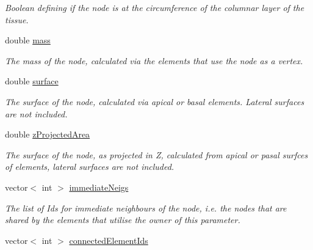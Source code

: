 \begin{DoxyCompactItemize}
\begin{DoxyCompactList}\small\item\em Boolean defining if the node is at the circumference of the columnar layer of the tissue. \end{DoxyCompactList}\item 
\hypertarget{classNode_a63e510fc9158eb15e751861bc14eae38}{}double \hyperlink{classNode_a63e510fc9158eb15e751861bc14eae38}{mass}\label{classNode_a63e510fc9158eb15e751861bc14eae38}

\begin{DoxyCompactList}\small\item\em The mass of the node, calculated via the elements that use the node as a vertex. \end{DoxyCompactList}\item 
\hypertarget{classNode_aab30ea418838635c21593c47f39f2699}{}double \hyperlink{classNode_aab30ea418838635c21593c47f39f2699}{surface}\label{classNode_aab30ea418838635c21593c47f39f2699}

\begin{DoxyCompactList}\small\item\em The surface of the node, calculated via apical or basal elements. Lateral surfaces are not included. \end{DoxyCompactList}\item 
\hypertarget{classNode_af8e9678dfeffc9e99d925a83b58fde3d}{}double \hyperlink{classNode_af8e9678dfeffc9e99d925a83b58fde3d}{z\+Projected\+Area}\label{classNode_af8e9678dfeffc9e99d925a83b58fde3d}

\begin{DoxyCompactList}\small\item\em The surface of the node, as projected in Z, calculated from apical or pasal surfces of elements, lateral surfaces are not included. \end{DoxyCompactList}\item 
\hypertarget{classNode_ab22060fb9f61a0d93ec52e6045828782}{}vector$<$ int $>$ \hyperlink{classNode_ab22060fb9f61a0d93ec52e6045828782}{immediate\+Neigs}\label{classNode_ab22060fb9f61a0d93ec52e6045828782}

\begin{DoxyCompactList}\small\item\em The list of Id\textquotesingle{}s for immediate neighbours of the node, i.\+e. the nodes that are shared by the elements that utilise the owner of this parameter. \end{DoxyCompactList}\item 
\hypertarget{classNode_a18bae606efb025cc90b4c117776e0bf9}{}vector$<$ int $>$ \hyperlink{classNode_a18bae606efb025cc90b4c117776e0bf9}{connected\+Element\+Ids}\label{classNode_a18bae606efb025cc90b4c117776e0bf9}


\end{DoxyCompactItemize}
